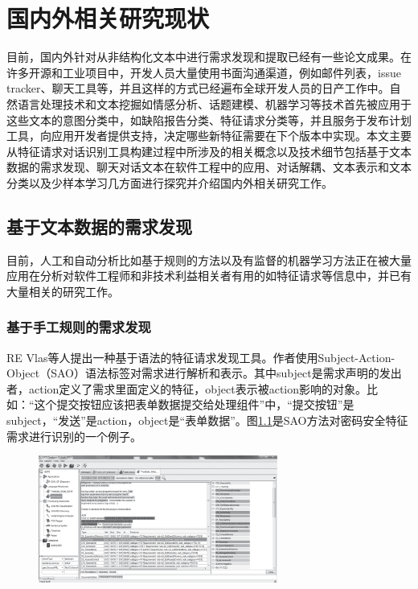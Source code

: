 \chapter{国内外相关研究现状}\label{chap:related_work}

目前，国内外针对从非结构化文本中进行需求发现和提取已经有一些论文成果。在许多开源和工业项目中，开发人员大量使用书面沟通渠道，例如邮件列表，issue tracker、聊天工具等，并且这样的方式已经遍布全球开发人员的日产工作中。自然语言处理技术和文本挖掘如情感分析、话题建模、机器学习等技术首先被应用于这些文本的意图分类中，如缺陷报告分类、特征请求分类等\cite{maalej2015bug}，并且服务于发布计划工具，向应用开发者提供支持，决定哪些新特征需要在下个版本中实现。本文主要从特征请求对话识别工具构建过程中所涉及的相关概念以及技术细节包括基于文本数据的需求发现、聊天对话文本在软件工程中的应用、对话解耦、文本表示和文本分类以及少样本学习几方面进行探究并介绍国内外相关研究工作。

\section{基于文本数据的需求发现}


目前，人工和自动分析比如基于规则的方法以及有监督的机器学习方法正在被大量应用在分析对软件工程师和非技术利益相关者有用的如特征请求等信息中\cite{Morales2019Speech}，并已有大量相关的研究工作。
\subsection{基于手工规则的需求发现}

RE Vlas等人\cite{morales2014discovering}提出一种基于语法的特征请求发现工具。作者使用Subject-Action-Object（SAO）语法标签对需求进行解析和表示。其中subject是需求声明的发出者，action定义了需求里面定义的特征，object表示被action影响的对象。比如：“这个提交按钮应该把表单数据提交给处理组件”中，“提交按钮”是subject，“发送”是action，object是“表单数据”。图\ref{fig:sao}是SAO方法对密码安全特征需求进行识别的一个例子。
\begin{figure}[htbp]
    \centering
    \includegraphics[width=0.70\textwidth]{Img/sao.png}
    \label{fig:sao}
\end{figure}


